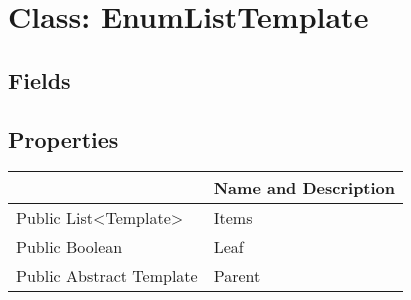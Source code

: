 \documentclass[11pt, oneside, a4paper]{book}
\begin{document}
\hypertarget{SoftwareEngineeringTools.{}Documentation.{}EnumListTemplate}{}
\section{Class: EnumListTemplate}

\subsection{Fields}

\subsection{Properties}
\begin{center}
\begin{tabular}{| p{3cm} | p{12cm} | }
\hline
\textbf{ } & \textbf{ Name and Description}\\
\hline
 Public  List<Template> &  Items\hypertarget{SoftwareEngineeringTools.{}Documentation.{}EnumListTemplate.{}Items}{}\\
\hline
 Public  Boolean &  Leaf\hypertarget{SoftwareEngineeringTools.{}Documentation.{}EnumListTemplate.{}Leaf}{}\\
\hline
 Public  Abstract  Template &  Parent\hypertarget{SoftwareEngineeringTools.{}Documentation.{}EnumListTemplate.{}Parent}{}\\
\hline
\end{tabular}
\end{center}
\end{document}
